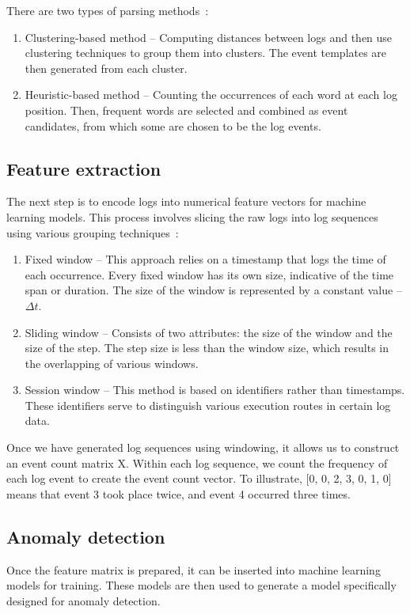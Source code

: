 There are two types of parsing methods~\cite{he2016expreport}:
\begin{enumerate}
    \item Clustering-based method \--- Computing distances between logs and then use clustering techniques to group them into clusters. The event templates are then generated from each cluster.
    \item Heuristic-based method \--- Counting the occurrences of each word at each log position. Then, frequent words are selected and combined as event candidates, from which some are chosen to be the log events.
\end{enumerate}

\subsection{Feature extraction}
The next step is to encode logs into numerical feature vectors for machine learning models. This process involves slicing the raw logs into log sequences using various grouping techniques~\cite{he2016expreport}:

\begin{enumerate}
    \item Fixed window \--- This approach relies on a timestamp that logs the time of each occurrence. Every fixed window has its own size, indicative of the time span or duration. The size of the window is represented by a constant value \--- $\Delta t$.
    \item Sliding window \--- Consists of two attributes: the size of the window and the size of the step. The step size is less than the window size, which results in the overlapping of various windows.
    \item Session window \--- This method is based on identifiers rather than timestamps. These identifiers serve to distinguish various execution routes in certain log data.
\end{enumerate}

Once we have generated log sequences using windowing, it allows us to construct an event count matrix X. Within each log sequence, we count the frequency of each log event to create the event count vector. To illustrate, [0, 0, 2, 3, 0, 1, 0] means that event 3 took place twice, and event 4 occurred three times.~\cite{he2016expreport}

\subsection{Anomaly detection}
Once the feature matrix is prepared, it can be inserted into machine learning models for training. These models are then used to generate a model specifically designed for anomaly detection.~\cite{he2016expreport}




